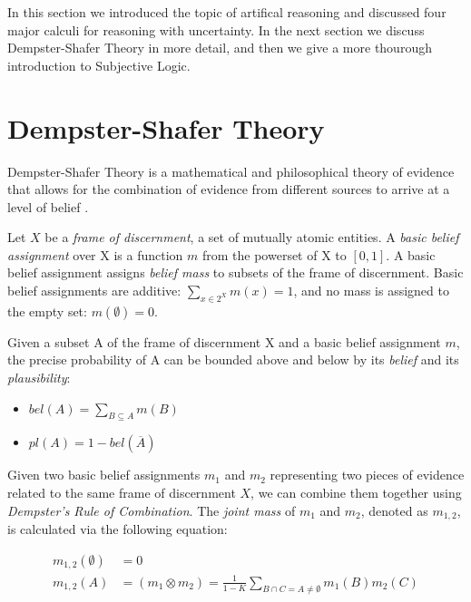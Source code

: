 \documentclass[thesis.tex]{subfiles}
\begin{document}
In this section we introduced the topic of artifical reasoning and discussed
four major calculi for reasoning with uncertainty. In the next section we
discuss Dempster-Shafer Theory in more detail, and then we give a more
thourough introduction to Subjective Logic.






%
%

\section{Dempster-Shafer Theory}

Dempster-Shafer Theory is a mathematical and philosophical theory of evidence that allows for
the combination of evidence from different sources to arrive at a level of
belief \cite{shafer1976mathematical}.

Let $X$ be a \emph{frame of discernment},
a set of mutually atomic entities. A \emph{basic belief assignment} over X is a function $m$ from the
powerset of X to $[0, 1]$. A basic belief assignment assigns \emph{belief mass} to subsets of the frame
of discernment. Basic belief assignments are additive: $\sum_{x \in 2^X} m(x) = 1$,
and no mass is assigned to the empty set: $m(\emptyset) = 0$.

Given a subset A of the frame of discernment X and a basic belief assignment $m$, the precise probability
of A can be bounded above and below by its \emph{belief} and its \emph{plausibility}:

\begin{itemize}
  \item $bel(A) = \sum_{B \subseteq A} m(B)$
  \item $pl(A) = 1 - bel(\overline{A})$
\end{itemize}

Given two basic belief assignments $m_1$ and $m_2$ representing two pieces of evidence related to the
same frame of discernment $X$, we can combine them together using \emph{Dempster's Rule of Combination}. The
\emph{joint mass} of $m_1$ and $m_2$, denoted as $m_{1,2}$, is calculated via the following equation:

\begin{equation*}
  \begin{split}
    m_{1,2}\left(\emptyset\right) & = 0 \\
    m_{1,2}\left(A\right)         & = \left( m_1 \otimes m_2\right) = \frac{1}{1 - K} \sum_{B \cap C = A \neq \emptyset} m_1(B) m_2(C)
  \end{split}
\end{equation*}
\end{document}

